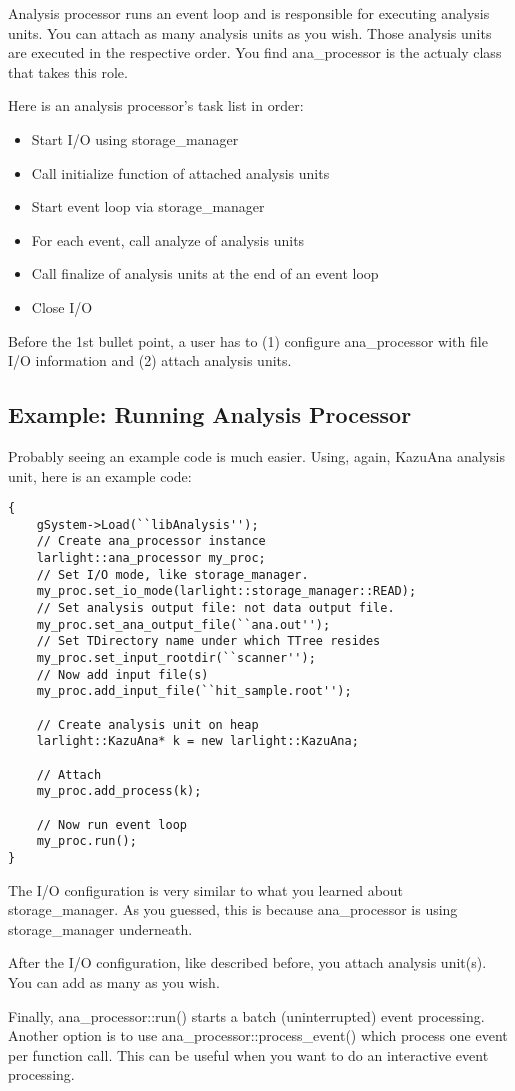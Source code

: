 
Analysis processor runs an event loop and is responsible for executing analysis units. You can attach as many analysis units as you wish. Those analysis units are executed in the respective order. You find {\ttfamily ana\_processor} is the actualy \CPP class that takes this role.

Here is an analysis processor's task list in order:
\begin{itemize}
\item Start I/O using {\ttfamily storage\_manager}
\item Call {\ttfamily initialize} function of attached analysis units
\item Start event loop via {\ttfamily storage\_manager}
\item For each event, call {\ttfamily analyze} of analysis units
\item Call {\ttfamily finalize} of analysis units at the end of an event loop
\item Close I/O
\end{itemize}
Before the 1st bullet point, a user has to (1) configure {\ttfamily ana\_processor} with file I/O information and (2) attach analysis units.

\subsection{Example: Running Analysis Processor}
Probably seeing an example code is much easier. Using, again, {\ttfamily KazuAna} analysis unit, here is an example \CINT code:
\begin{lstlisting}
{
    gSystem->Load(``libAnalysis'');
    // Create ana_processor instance
    larlight::ana_processor my_proc;
    // Set I/O mode, like storage_manager.
    my_proc.set_io_mode(larlight::storage_manager::READ);
    // Set analysis output file: not data output file.
    my_proc.set_ana_output_file(``ana.out'');
    // Set TDirectory name under which TTree resides
    my_proc.set_input_rootdir(``scanner'');
    // Now add input file(s)
    my_proc.add_input_file(``hit_sample.root'');
    
    // Create analysis unit on heap
    larlight::KazuAna* k = new larlight::KazuAna;
    
    // Attach
    my_proc.add_process(k);

    // Now run event loop
    my_proc.run();
}
\end{lstlisting}
The I/O configuration is very similar to what you learned about {\ttfamily storage\_manager}. As you guessed, this is because {\ttfamily ana\_processor} is using {\ttfamily storage\_manager} underneath.

After the I/O configuration, like described before, you attach analysis unit(s). You can add as many as you wish.

Finally, {\ttfamily ana\_processor::run()} starts a batch (uninterrupted) event processing. Another option is to use {\ttfamily ana\_processor::process\_event()} which process one event per function call. This can be useful when you want to do an interactive event processing.



